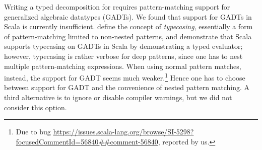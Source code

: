 Writing a typed decomposition for  requires pattern-matching support for generalized algebraic datatypes (GADTs). We found that support for GADTs in Scala is currently insufficient. \citet{Emir07Patterns} define the concept of \emph{typecasing}, essentially a form of pattern-matching limited to non-nested patterns, and demonstrate that Scala supports typecasing on GADTs in Scala by demonstrating a typed evaluator; however, typecasing is rather verbose for deep patterns, since one has to nest multiple pattern-matching expressions.
When using normal pattern matches, instead, the support for GADT seems much weaker.\footnote{Due to bug \url{https://issues.scala-lang.org/browse/SI-5298?focusedCommentId=56840##comment-56840}, reported by us.}
Hence one has to choose between support for GADT and the convenience of nested pattern matching.
A third alternative is to ignore or disable compiler warnings, but we did not consider this option. 





